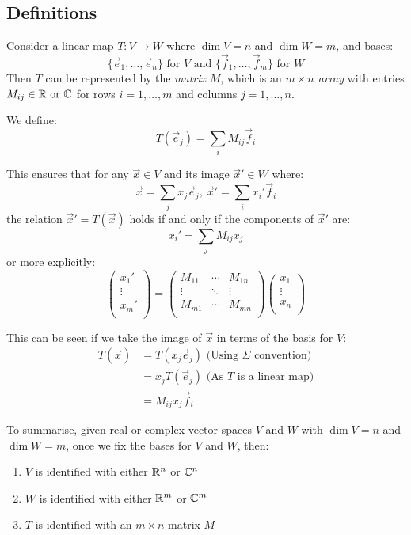 \documentclass[../main.tex]{subfiles}
\begin{document}
\subsection{Definitions}
\begin{definition}
  Consider a linear map $T: V \to W$ where $\dim V = n$ and $\dim W = m$, and bases:
  \[
    \{\vec{e}_1, \ldots, \vec{e}_n\} \text{ for $V$ and }
    \{\vec{f}_1, \ldots, \vec{f}_m\} \text{ for $W$}
  \]Then $T$ can be represented by the \textit{matrix} $M$, which is an \textit{$m \times n$ array} with entries $M_{i j} \in \mathbb{R} \text{ or }\mathbb{C}$ for rows $i = 1, \ldots, m$ and columns $j = 1, \ldots, n$.

  We define:
  \[
    T(\vec{e}_j) = \sum_{i} M_{i j}\vec{f}_i
  \]
\end{definition}
This ensures that for any $\vec{x} \in V$ and its image $\vec{x}' \in W$ where:
\[
  \vec{x} = \sum_{j} x_j \vec{e}_j,\ \vec{x}' = \sum_{i} x_i' \vec{f}_i
\]
the relation $\vec{x}' = T(\vec{x})$ holds if and only if the components of $\vec{x}'$ are:
\[
  x_i'=\sum_{j} M_{i j}x_j
\]
or more explicitly:
\[
  \begin{pmatrix}
  x_1' \\
  \vdots \\
  x_m' \\
  \end{pmatrix} =
  \begin{pmatrix}
  M_{1 1} & \cdots & M_{1 n} \\
  \vdots & \ddots & \vdots \\
  M_{m 1} & \cdots & M_{m n} \\
  \end{pmatrix}
  \begin{pmatrix}
  x_1 \\
  \vdots \\
  x_n \\
  \end{pmatrix}
\]

This can be seen if we take the image of $\vec{x}$ in terms of the basis for $V$:
\begin{align*}
  T(\vec{x}) &= T(x_j \vec{e}_j) \text{ (Using $\Sigma$ convention)} \\
             &= x_j T(\vec{e}_j) \text{ (As $T$ is a linear map)}\\
             &= M_{i j}x_j \vec{f}_i
\end{align*}
\begin{remark}[Summary]\par
  To summarise, given real or complex vector spaces $V$ and $W$ with $\dim V = n$ and $\dim W = m$,
  once we fix the bases for $V$ and $W$, then:
  \begin{enumerate}
    \item $V$ is identified with either $\mathbb{R}^{n}$ or $\mathbb{C}^{n}$
    \item $W$ is identified with either $\mathbb{R}^{m}$ or $\mathbb{C}^{m}$
    \item $T$ is identified with an $m \times n$ matrix $M$
  \end{enumerate}
\end{remark}
\end{document}
